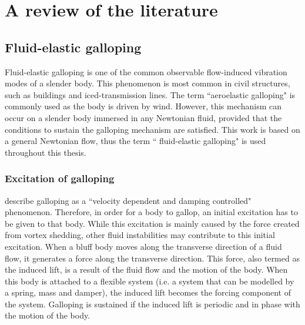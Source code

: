 \chapter{A review of the literature}
\label{chap:lit-review}

\section{Fluid-elastic galloping}
\label{fluid-elastic galloping}

Fluid-elastic galloping is one of the common observable flow-induced vibration modes of a slender body. This phenomenon is most common in civil structures, such as buildings and iced-transmission lines. The term ``aeroelastic galloping" is commonly used as the body is driven by wind. However, this mechanism can occur on a slender body immersed in any Newtonian fluid, provided that the conditions to sustain the galloping mechanism are satisfied. This work is based on a general Newtonian flow, thus the term `` fluid-elastic galloping" is used throughout this thesis.
   

\subsection{Excitation of galloping}
\label{sec:exci-galloping}

\citet{Paidoussis2010} describe galloping as a ``velocity dependent and damping controlled" phenomenon. Therefore, in order for a body to gallop, an initial excitation has to be given to that body. While this excitation is mainly caused by the force created from vortex shedding, other fluid instabilities may contribute to this initial excitation.  When a bluff body moves along the transverse direction of a fluid flow, it generates a force along the transverse direction. This force, also termed as the induced lift, is a result of the fluid flow and the motion of the body. When this body is attached to a flexible system (i.e. a system that can be modelled by a spring, mass and damper), the induced lift becomes the forcing component of the system. Galloping is sustained  if the induced lift is periodic and in phase with the motion of the body.




